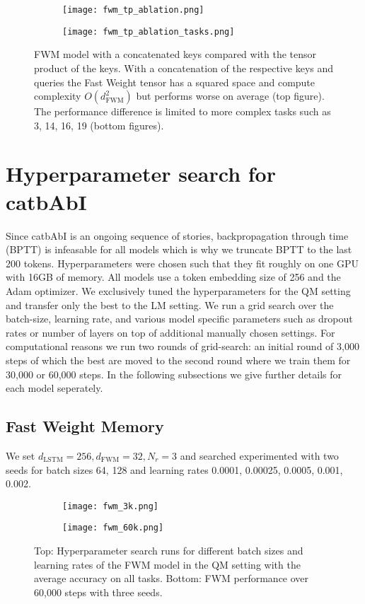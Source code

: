 \documentclass{article} \usepackage{iclr2021_conference,times}
\begin{document}
\begin{figure}[H]
  \centering
\begin{subfigure}[b]{\textwidth}
    \texttt{[image: fwm\_tp\_ablation.png]}
  \end{subfigure}
  \begin{subfigure}[b]{\textwidth}
    \texttt{[image: fwm\_tp\_ablation\_tasks.png]}
  \end{subfigure}
  \caption{FWM model with a concatenated keys compared with the tensor product of the keys. With a concatenation of the respective keys and queries the Fast Weight tensor has a squared space and compute complexity $O(d_\text{FWM}^2)$ but performs worse on average (top figure). The performance difference is limited to more complex tasks such as 3, 14, 16, 19 (bottom figures).}
  \label{appendix:fig:productAblation}
\end{figure}

\newpage
\section{Hyperparameter search for catbAbI}
\label{appendix:sec:catbAbIparams}
Since catbAbI is an ongoing sequence of stories, backpropagation through time (BPTT) is infeasable for all models which is why we truncate BPTT to the last 200 tokens.
Hyperparameters were chosen such that they fit roughly on one GPU with 16GB of memory.
All models use a token embedding size of 256 and the Adam optimizer. 
We exclusively tuned the hyperparameters for the QM setting and transfer only the best to the LM setting. 
We run a grid search over the batch-size, learning rate, and various model specific parameters such as dropout rates or number of layers on top of additional manually chosen settings. For computational reasons we run two rounds of grid-search: an initial round of 3,000 steps of which the best are moved to the second round where we train them for 30,000 or 60,000 steps. In the following subsections we give further details for each model seperately. 

\subsection{Fast Weight Memory}
We set $d_\text{LSTM}=256, d_\text{FWM}=32, N_r=3$ and searched experimented with two seeds for batch sizes 64, 128 and learning rates 0.0001, 0.00025, 0.0005, 0.001, 0.002.
\begin{figure}[H]
  \centering
\begin{subfigure}[b]{0.8\linewidth}
    \texttt{[image: fwm\_3k.png]}
  \end{subfigure}
  \begin{subfigure}[b]{0.8\linewidth}
    \texttt{[image: fwm\_60k.png]}
  \end{subfigure}
  \caption{Top: Hyperparameter search runs for different batch sizes and learning rates of the FWM model in the QM setting with the average accuracy on all tasks. Bottom: FWM performance over 60,000 steps with three seeds.}
  \label{appendix:fig:fwm}
\end{figure}
\end{document}
